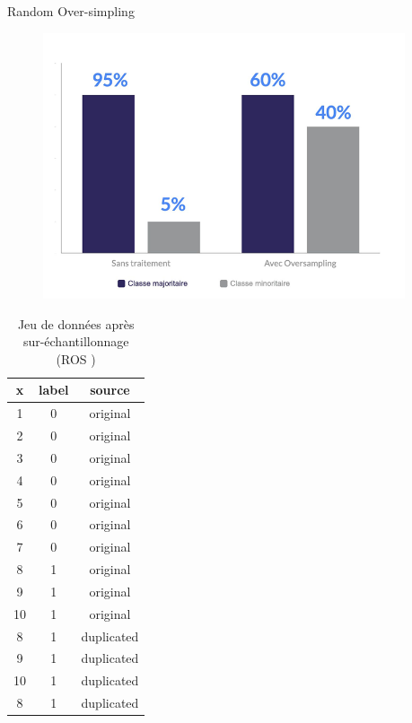 \documentclass{beamer}
\begin{document}
\begin{frame}{Random Over-simpling}
\begin{figure}
    \centering
    \includegraphics[width=0.95\textwidth]{images/ROS.png}
\end{figure}
    
\end{frame}

\begin{frame}
\begin{table}
\centering
\caption{Jeu de données après sur-échantillonnage (ROS )}
\begin{tabular}{|c|c|c|}
\hline
\textbf{x} & \textbf{label} & \textbf{source} \\ 
\hline
1   & 0 & original \\
2 &  0 & original \\
3 &  0 & original \\
4 &  0 & original \\
5 &  0 & original \\
6 &  0 & original \\
7 &  0 & original \\
8 &  1 & original \\
9 &  1 & original \\
10 &  1 & original \\
8 &  1 & duplicated \\
 9 &  1 & duplicated \\
 10 &  1 & duplicated \\
 8 &  1 & duplicated \\
\hline
\end{tabular}
\end{table}

\end{frame}
\end{document}
